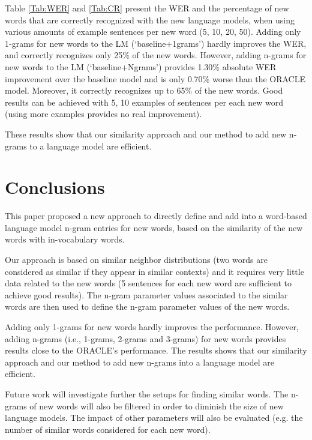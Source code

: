 \documentclass[conference]{IEEEtran}
\begin{document}
Table \ref{Tab:WER} and \ref{Tab:CR} present the WER and the percentage of new words that are correctly recognized with the new language models, when using various amounts of example sentences per new word (5, 10, 20, 50).
Adding only 1-grams for new words to the LM (`baseline+1grams') hardly improves the WER, and correctly recognizes only 25\% of the new words. 
However, adding n-grams for new words to the LM (`baseline+Ngrams') provides 1.30\% absolute WER improvement over the baseline model and is only 0.70\% worse than the ORACLE model. Moreover, it correctly recognizes up to 65\% of the new words. 
Good results can be achieved with 5, 10 examples of sentences per each new word (using more examples provides no real improvement). 

These results show that our similarity approach and our method to add new n-grams to a language model are efficient. 

\section{Conclusions}

This paper proposed a new approach to directly define and add into a word-based language model n-gram entries for new words, based on the similarity of the new words with in-vocabulary words. 

Our approach is based on similar neighbor distributions (two words are considered as similar if they appear in similar contexts) and it requires very little data related to the new words (5 sentences for each new word are sufficient to achieve good results).
The n-gram parameter values associated to the similar words are then used to define the n-gram parameter values of the new words. 

Adding only 1-grams for new words hardly improves the performance. 
However, adding n-grams (i.e., 1-grams, 2-grams and 3-grams) for new words provides results close to the ORACLE's performance. 
The results shows that our similarity approach and our method to add new n-grams into a language model are efficient.

Future work will investigate further the setups for finding similar words. 
The n-grams of new words will also be filtered in order to diminish the size of new language models.
The impact of other parameters will also be evaluated (e.g. the number of similar words considered for each new word).
\end{document}
